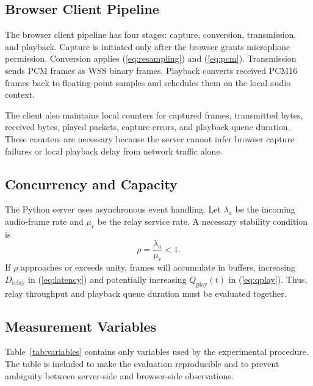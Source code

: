 \documentclass[conference]{IEEEtran}
\begin{document}
\subsection{Browser Client Pipeline}

The browser client pipeline has four stages: capture, conversion, transmission, and playback. Capture is initiated only after the browser grants microphone permission. Conversion applies (\ref{eq:resampling}) and (\ref{eq:pcm}). Transmission sends PCM frames as WSS binary frames. Playback converts received PCM16 frames back to floating-point samples and schedules them on the local audio context.

The client also maintains local counters for captured frames, transmitted bytes, received bytes, played packets, capture errors, and playback queue duration. These counters are necessary because the server cannot infer browser capture failures or local playback delay from network traffic alone.

\subsection{Concurrency and Capacity}

The Python server uses asynchronous event handling. Let $\lambda_a$ be the incoming audio-frame rate and $\mu_r$ be the relay service rate. A necessary stability condition is
\begin{equation}
    \rho = \frac{\lambda_a}{\mu_r} < 1.
    \label{eq:rho}
\end{equation}
If $\rho$ approaches or exceeds unity, frames will accumulate in buffers, increasing $D_{\mathrm{relay}}$ in (\ref{eq:latency}) and potentially increasing $Q_{\mathrm{play}}(t)$ in (\ref{eq:qplay}). Thus, relay throughput and playback queue duration must be evaluated together.

\subsection{Measurement Variables}

Table~\ref{tab:variables} contains only variables used by the experimental procedure. The table is included to make the evaluation reproducible and to prevent ambiguity between server-side and browser-side observations.
\end{document}
